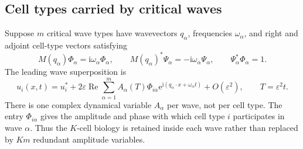 \documentclass[11pt]{article}
\newcommand{\ii}{\mathrm{i}}
\newcommand{\ee}{\mathrm{e}}
\newcommand{\RePart}{\operatorname{Re}}
\begin{document}
\subsection{Cell types carried by critical waves}

Suppose $m$ critical wave types have wavevectors $q_\alpha$, frequencies
$\omega_\alpha$, and right and adjoint cell-type vectors satisfying
\begin{equation}
 M(q_\alpha)\Phi_\alpha=\ii\omega_\alpha\Phi_\alpha,
 \qquad M(q_\alpha)^*\Psi_\alpha=-\ii\omega_\alpha\Psi_\alpha,
 \qquad \Psi_\alpha^*\Phi_\alpha=1.
 \label{eq:eigenvectors}
\end{equation}
The leading wave superposition is
\begin{equation}
 u_i(x,t)=u_i^*+2\varepsilon\RePart\sum_{\alpha=1}^m
 A_\alpha(T)\Phi_{i\alpha}
 \ee^{\ii(q_\alpha\cdot x+\omega_\alpha t)}+O(\varepsilon^2),
 \qquad T=\varepsilon^2t.
 \label{eq:cell-wave-superposition}
\end{equation}
There is one complex dynamical variable $A_\alpha$ per wave, not per cell
type.  The entry $\Phi_{i\alpha}$ gives the amplitude and phase with which
cell type $i$ participates in wave $\alpha$.  Thus the $K$-cell biology is
retained inside each wave rather than replaced by $K m$ redundant amplitude
variables.
\end{document}
